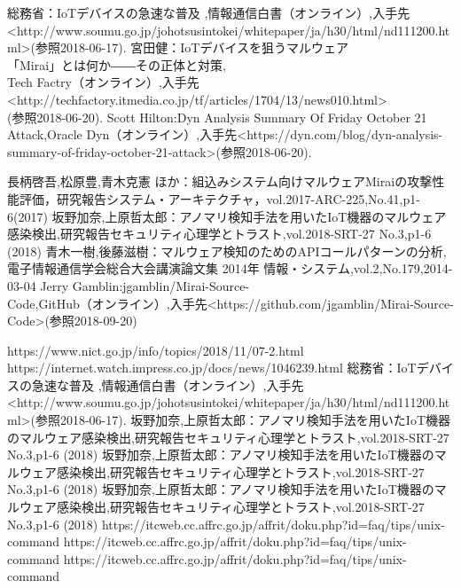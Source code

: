 
\begin{thebibliography}{10}
		総務省：IoTデバイスの急速な普及 ,情報通信白書（オンライン）,入手先\textless http://www.soumu.go.jp/johotsusintokei/whitepaper/ja/h30/html/nd111200.html\textgreater(参照2018-06-17).
        宮田健：IoTデバイスを狙うマルウェア\\「Mirai」とは何か――その正体と対策,\\Tech Factry（オンライン）,入手先\textless http:\slash\slash{}techfactory.itmedia.co.jp\slash{}tf\slash{}articles\slash{}1704\slash{}13\slash{}news010.html\textgreater\\(参照2018-06-20).
       Scott Hilton:Dyn Analysis Summary Of Friday October 21 Attack,Oracle Dyn（オンライン）,入手先\textless https:\slash\slash{}dyn.com\slash{}blog\slash{}dyn-analysis-summary-of-friday-october-21-attack\textgreater (参照2018-06-20).

    	長柄啓吾,松原豊,青木克憲 ほか：組込みシステム向けマルウェアMiraiの攻撃性能評価，研究報告システム・アーキテクチャ，vol.2017-ARC-225,No.41,p1-6(2017)
        坂野加奈,上原哲太郎：アノマリ検知手法を用いたIoT機器のマルウェア感染検出,研究報告セキュリティ心理学とトラスト,vol.2018-SRT-27 No.3,p1-6 (2018)
     	青木一樹,後藤滋樹：マルウェア検知のためのAPIコールパターンの分析,電子情報通信学会総合大会講演論文集 2014年 情報・システム,vol.2,No.179,2014-03-04
     Jerry Gamblin:jgamblin/Mirai-Source-\\Code,GitHub（オンライン）,入手先\textless https://github.com/jgamblin/Mirai-Source-Code\textgreater(参照2018-09-20)

        https://www.nict.go.jp/info/topics/2018/11/07-2.html
        https://internet.watch.impress.co.jp/docs/news/1046239.html
    総務省：IoTデバイスの急速な普及 ,情報通信白書（オンライン）,入手先\textless http://www.soumu.go.jp/johotsusintokei/whitepaper/ja/h30/html/nd111200.html\textgreater(参照2018-06-17).
    坂野加奈,上原哲太郎：アノマリ検知手法を用いたIoT機器のマルウェア感染検出,研究報告セキュリティ心理学とトラスト,vol.2018-SRT-27 No.3,p1-6 (2018)
    坂野加奈,上原哲太郎：アノマリ検知手法を用いたIoT機器のマルウェア感染検出,研究報告セキュリティ心理学とトラスト,vol.2018-SRT-27 No.3,p1-6 (2018)
    坂野加奈,上原哲太郎：アノマリ検知手法を用いたIoT機器のマルウェア感染検出,研究報告セキュリティ心理学とトラスト,vol.2018-SRT-27 No.3,p1-6 (2018)
    https://itcweb.cc.affrc.go.jp/affrit/doku.php?id=faq/tips/unix-command 
    https://itcweb.cc.affrc.go.jp/affrit/doku.php?id=faq/tips/unix-command
    https://itcweb.cc.affrc.go.jp/affrit/doku.php?id=faq/tips/unix-command
\end{thebibliography}
